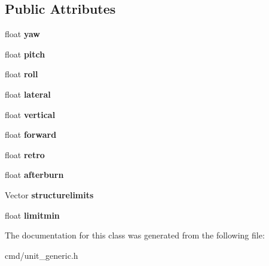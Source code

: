 \subsection*{Public Attributes}
\begin{DoxyCompactItemize}
\item 
float {\bfseries yaw}\hypertarget{classUnit_1_1Limits_af306b0cd00e1adb58e1538e14e84a1db}{}\label{classUnit_1_1Limits_af306b0cd00e1adb58e1538e14e84a1db}

\item 
float {\bfseries pitch}\hypertarget{classUnit_1_1Limits_ad63ca14e97f04a2c873839a932366151}{}\label{classUnit_1_1Limits_ad63ca14e97f04a2c873839a932366151}

\item 
float {\bfseries roll}\hypertarget{classUnit_1_1Limits_a02f1a2e51f36f9b6fb0dda042eaaeeaf}{}\label{classUnit_1_1Limits_a02f1a2e51f36f9b6fb0dda042eaaeeaf}

\item 
float {\bfseries lateral}\hypertarget{classUnit_1_1Limits_a0a24804d08bf5685ff0b93b2b26c6afd}{}\label{classUnit_1_1Limits_a0a24804d08bf5685ff0b93b2b26c6afd}

\item 
float {\bfseries vertical}\hypertarget{classUnit_1_1Limits_a70dd947cc0c6a4b15b9a1e6bf9bbcffd}{}\label{classUnit_1_1Limits_a70dd947cc0c6a4b15b9a1e6bf9bbcffd}

\item 
float {\bfseries forward}\hypertarget{classUnit_1_1Limits_a55105a4e0d89371b7e1298f04a51bb8c}{}\label{classUnit_1_1Limits_a55105a4e0d89371b7e1298f04a51bb8c}

\item 
float {\bfseries retro}\hypertarget{classUnit_1_1Limits_ae928c0f21cc76a295953bef5d603ac64}{}\label{classUnit_1_1Limits_ae928c0f21cc76a295953bef5d603ac64}

\item 
float {\bfseries afterburn}\hypertarget{classUnit_1_1Limits_ac1381edbf59305095d893a3ea22bb6f2}{}\label{classUnit_1_1Limits_ac1381edbf59305095d893a3ea22bb6f2}

\item 
Vector {\bfseries structurelimits}\hypertarget{classUnit_1_1Limits_aae0f407387fc6de0c603dd0f433f5cb1}{}\label{classUnit_1_1Limits_aae0f407387fc6de0c603dd0f433f5cb1}

\item 
float {\bfseries limitmin}\hypertarget{classUnit_1_1Limits_ae057a0f8abe33ef5d228e661f3228fab}{}\label{classUnit_1_1Limits_ae057a0f8abe33ef5d228e661f3228fab}

\end{DoxyCompactItemize}


The documentation for this class was generated from the following file\+:\begin{DoxyCompactItemize}
\item 
cmd/unit\+\_\+generic.\+h\end{DoxyCompactItemize}
